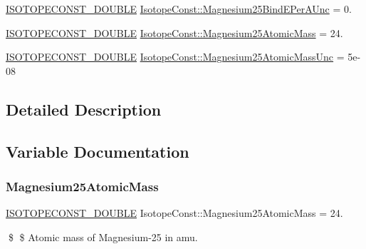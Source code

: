 \begin{DoxyCompactItemize}
\mbox{\hyperlink{group___isotope_const-_macros_ga8f45a7272ce02c0b4c65c44636ed719a}{I\+S\+O\+T\+O\+P\+E\+C\+O\+N\+S\+T\+\_\+\+D\+O\+U\+B\+LE}} \mbox{\hyperlink{group___isotope_const-_magnesium-_mg25_ga24ab7815d43973158f71ef6d6b7871be}{Isotope\+Const\+::\+Magnesium25\+Bind\+E\+Per\+A\+Unc}} = 0.
\item 
\mbox{\hyperlink{group___isotope_const-_macros_ga8f45a7272ce02c0b4c65c44636ed719a}{I\+S\+O\+T\+O\+P\+E\+C\+O\+N\+S\+T\+\_\+\+D\+O\+U\+B\+LE}} \mbox{\hyperlink{group___isotope_const-_magnesium-_mg25_gaa0b9e9fdd59289cbc424b96e20d582ac}{Isotope\+Const\+::\+Magnesium25\+Atomic\+Mass}} = 24.
\item 
\mbox{\hyperlink{group___isotope_const-_macros_ga8f45a7272ce02c0b4c65c44636ed719a}{I\+S\+O\+T\+O\+P\+E\+C\+O\+N\+S\+T\+\_\+\+D\+O\+U\+B\+LE}} \mbox{\hyperlink{group___isotope_const-_magnesium-_mg25_ga9c7df70d540d27aed3ed64a8f9fab3e4}{Isotope\+Const\+::\+Magnesium25\+Atomic\+Mass\+Unc}} = 5e-\/08
\end{DoxyCompactItemize}


\subsection{Detailed Description}


\subsection{Variable Documentation}
\mbox{\label{group___isotope_const-_magnesium-_mg25_gaa0b9e9fdd59289cbc424b96e20d582ac}} 
\subsubsection{\texorpdfstring{Magnesium25\+Atomic\+Mass}{Magnesium25AtomicMass}}
{\footnotesize\ttfamily \mbox{\hyperlink{group___isotope_const-_macros_ga8f45a7272ce02c0b4c65c44636ed719a}{I\+S\+O\+T\+O\+P\+E\+C\+O\+N\+S\+T\+\_\+\+D\+O\+U\+B\+LE}} Isotope\+Const\+::\+Magnesium25\+Atomic\+Mass = 24.}

\$ \$ Atomic mass of Magnesium-\/25 in amu. \mbox{\label{group___isotope_const-_magnesium-_mg25_ga9c7df70d540d27aed3ed64a8f9fab3e4}} 

